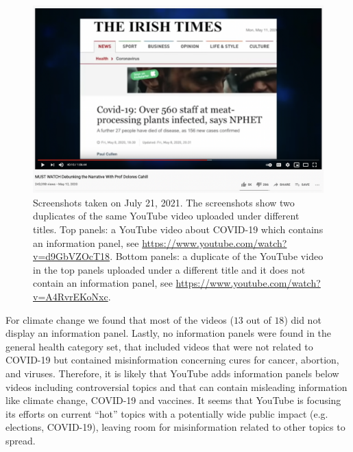 \documentclass{article}
\begin{document}
\begin{figure}[h]
		\includegraphics[scale=0.2]{./img/youtube_panels/news_without_banner.png} 
	\caption{Screenshots taken on July 21, 2021. The screenshots show two duplicates of the same YouTube video uploaded under different titles. Top panels: a YouTube video about COVID-19 which contains an information panel, see \href{https://www.youtube.com/watch?v=d9GbVZOcT18}{https://www.youtube.com/watch?v=d9GbVZOcT18}. Bottom panels: a duplicate of the YouTube video in the top panels uploaded under a different title and it does not contain an information panel, see \href{https://www.youtube.com/watch?v=A4RvrEKoNxc}{https://www.youtube.com/watch?v=A4RvrEKoNxc}. }
	\label{duplicates_yt}
\end{figure}

\smallskip

For climate change we found that most of the videos ($13$ out of $18$) did not display an information panel. Lastly, no information panels were found in the general health category set, that included videos that were not related to COVID-19 but contained misinformation concerning cures for cancer, abortion, and viruses. 
Therefore, it is likely that YouTube adds information panels below videos including controversial topics and that can contain misleading information like climate change, COVID-19 and vaccines. 
It seems that YouTube is focusing its efforts on current ``hot'' topics with a potentially wide public impact (e.g. elections, COVID-19), leaving room for misinformation related to other topics to spread.
\end{document}

